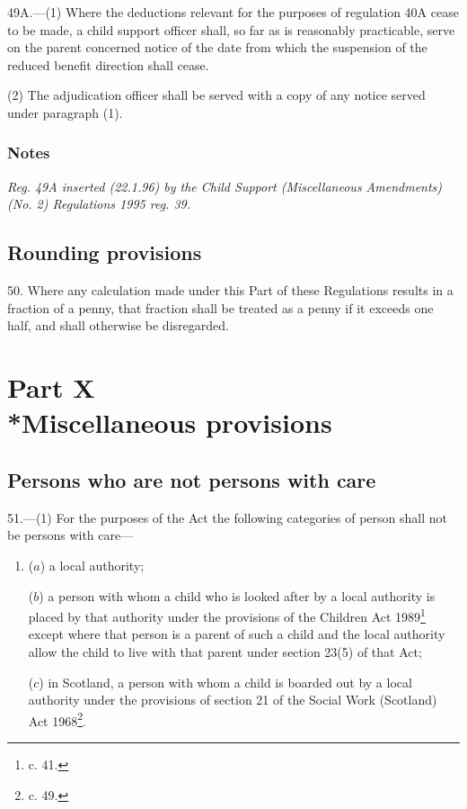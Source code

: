 \documentclass[a4paper]{article}
\newcommand{\parthead}{}
\newcommand\amendment[1]{\subsubsection*{Notes}{\itshape\frenchspacing\footnotesize #1 \par}}
\begin{document}
49A.—(1) Where the deductions relevant for the purposes of regulation 40A cease to be made, a child support officer shall, so far as is reasonably practicable, serve on the parent concerned notice of the date from which the suspension of the reduced benefit direction shall cease.

(2) The adjudication officer shall be served with a copy of any notice served under paragraph (1).

\amendment{
Reg. 49A inserted (22.1.96) by the Child Support (Miscellaneous Amendments) (No. 2) Regulations 1995 reg. 39.
}

\subsection[50. Rounding provisions]{Rounding provisions}

50.  Where any calculation made under this Part of these Regulations results in a fraction of a penny, that fraction shall be treated as a penny if it exceeds one half, and shall otherwise be disregarded.

\section[Part X --- Miscellaneous provisions]{Part X\\*Miscellaneous provisions}

\renewcommand\parthead{--- Part X}

\subsection[51. Persons who are not persons with care]{Persons who are not persons with care}

51.—(1) For the purposes of the Act the following categories of person shall not be persons with care—
\begin{enumerate}\item[]
($a$) a local authority;

($b$) a person with whom a child who is looked after by a local authority is placed by that authority under the provisions of the Children Act 1989\footnote{ c. 41.}
except where that person is a parent of such a child and the local authority allow the child to live with that parent under section 23(5) of that Act; %

($c$) in Scotland, a person with whom a child is boarded out by a local authority under the provisions of section 21 of the Social Work (Scotland) Act 1968\footnote{ c. 49.}.
\end{enumerate}
\end{document}
